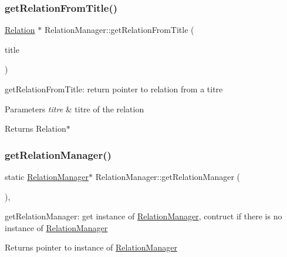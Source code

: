 \subsubsection{\texorpdfstring{get\+Relation\+From\+Title()}{getRelationFromTitle()}}
{\footnotesize\ttfamily \hyperlink{class_relation}{Relation} $\ast$ Relation\+Manager\+::get\+Relation\+From\+Title (\begin{DoxyParamCaption}\item[{Q\+String \&}]{title }\end{DoxyParamCaption})}



get\+Relation\+From\+Title\+: return pointer to relation from a titre 


\begin{DoxyParams}{Parameters}
{\em titre} & titre of the relation \\
\hline
\end{DoxyParams}
\begin{DoxyReturn}{Returns}
Relation$\ast$ 
\end{DoxyReturn}
\mbox{\label{class_relation_manager_a507b3edf840eb79a29f46662f3c30d04}} 
\subsubsection{\texorpdfstring{get\+Relation\+Manager()}{getRelationManager()}}
{\footnotesize\ttfamily static \hyperlink{class_relation_manager}{Relation\+Manager}$\ast$ Relation\+Manager\+::get\+Relation\+Manager (\begin{DoxyParamCaption}{ }\end{DoxyParamCaption})\hspace{0.3cm}{\ttfamily [inline]}, {\ttfamily [static]}}



get\+Relation\+Manager\+: get instance of \hyperlink{class_relation_manager}{Relation\+Manager}, contruct if there is no instance of \hyperlink{class_relation_manager}{Relation\+Manager} 

\begin{DoxyReturn}{Returns}
pointer to instance of \hyperlink{class_relation_manager}{Relation\+Manager} 
\end{DoxyReturn}
\mbox{\label{class_relation_manager_af587ffbf383d7fae096b0a2dba9ff679}} 
